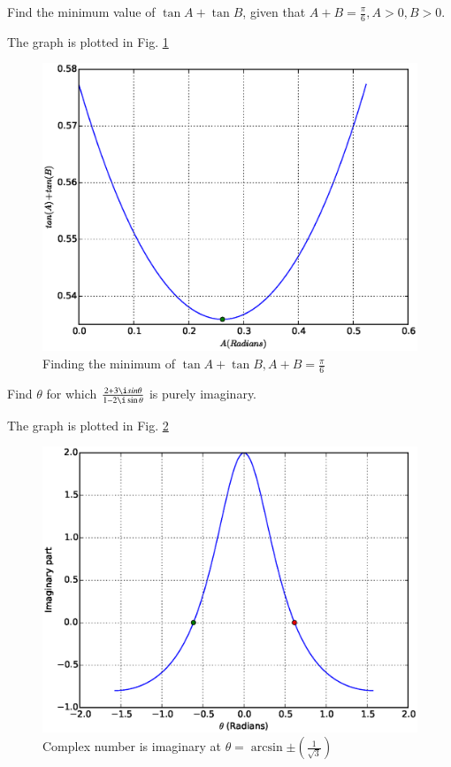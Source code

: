 \documentclass[journal,12pt,twocolumn]{IEEEtran}
\begin{document}
\begin{problem}
Find the minimum value of $\tan A + \tan B$, given that $ A+B = \frac{\pi}{6}, A>0,B>0$.
\end{problem}
%
\solution

The graph is plotted in Fig. \ref{fig_25}

%
\begin{figure}[h]
\centering
\includegraphics[width=\columnwidth]{./figs/ee16b1025}
\caption{ Finding the minimum of $\tan A + \tan B, A + B = \frac{\pi}{6}$}
\label{fig_25}	
\end{figure}
%
\begin{problem}
Find $\theta$ for which $\frac{2+3\i sin \theta}{1 - 2\i \sin \theta}$ is purely imaginary.
\end{problem}
%
\solution

The graph is plotted in Fig. \ref{fig_26}

%
\begin{figure}[h]
\centering
\includegraphics[width=\columnwidth]{./figs/ee16b1026}
\caption{ Complex number is imaginary at $\theta=\arcsin{\pm\left(\frac{1}{\sqrt{3}}\right)}$   }
\label{fig_26}	
\end{figure}
\end{document}

